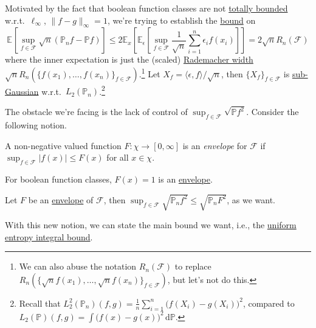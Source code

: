 \begin{prev}
	Motivated by the fact that boolean function classes are not \hyperref[def:totally-bounded]{totally bounded} w.r.t.\ \(\ell _\infty \), \(\lVert f - g \rVert _\infty = 1\), we're trying to establish the \hyperref[int:main-bound]{bound} on
	\[
		\mathbb{E}_{}\left[\sup _{f\in \mathscr{F} } \sqrt{n} (\mathbb{P} _n f - \mathbb{P} f) \right]
		\leq 2 \mathbb{E}_{x}\left[\mathbb{E}_{\epsilon }\left[\sup _{f\in \mathscr{F} } \frac{1}{\sqrt{n} } \sum_{i=1}^{n} \epsilon _i f(x_i) \right]  \right]
		= 2 \sqrt{n} R_n(\mathscr{F} )
	\]
	where the inner expectation is just the (scaled) \hyperref[def:Rademacher-width]{Rademacher width} \(\sqrt{n} R_n (\{ f(x_1), \dots , f(x_n)\}_{f\in \mathscr{F} } )\).\footnote{We can also abuse the notation \(R_n(\mathscr{F} )\) to replace \(R_n (\{ \sqrt{n} f(x_1) , \dots , \sqrt{n} f(x_n) \}_{f\in \mathscr{F} } )\), but let's not do this.} Let \(X_f = \langle \epsilon , f \rangle / \sqrt{n} \), then \(\{ X_f \} _{f\in \mathscr{F} }\) is \hyperref[def:sub-Gaussian-process]{sub-Gaussian} w.r.t.\ \(L_2(\mathbb{P} _n)\).\footnote{Recall that \(L_2^2(\mathbb{P} _n)(f, g) = \frac{1}{n}\sum_{i=1}^{n} \big(f(X_i) - g(X_i)\big)^2\), compared to \(L_2(\mathbb{P} )(f, g) = \int \big(f(x) - g(x)\big)^2 \,\mathrm{d} \mathbb{P} \).}
\end{prev}

The obstacle we're facing is the lack of control of \(\sup _{f\in \mathscr{F} } \sqrt{\mathbb{P} f^2} \). Consider the following notion.

\begin{definition}[Envelope]\label{def:envelope}
	A non-negative valued function \(F\colon \chi \to [0, \infty ]\) is an \emph{envelope} for \(\mathscr{F} \) if \(\sup _{f\in\mathscr{F} } \vert f(x) \vert \leq F(x)\) for all \(x\in \chi \).
\end{definition}

\begin{eg}
	For boolean function classes, \(F(x) = 1\) is an \hyperref[def:envelope]{envelope}.
\end{eg}

\begin{remark}
	Let \(F\) be an \hyperref[def:envelope]{envelope} of \(\mathscr{F} \), then \(\sup _{f\in \mathscr{F} }\sqrt{\mathbb{P} _n f^2} \leq \sqrt{\mathbb{P} _n F^2} \), as we want.
\end{remark}

With this new notion, we can state the main bound we want, i.e., the \hyperref[thm:uniform-entropy-integral-bound]{uniform entropy integral bound}.

